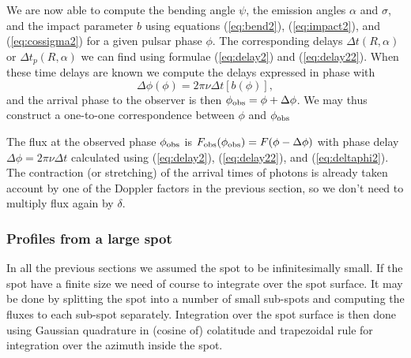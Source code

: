 \documentclass{wihuri}
\def\be{\begin{equation}}
\def\ee{\end{equation}}
\def\phiobs{\phi_{\rm obs}}
\begin{document}
We are now able to compute the bending angle $\psi$, the emission angles $\alpha$ and $\sigma$, and the impact parameter $b$ using equations (\ref{eq:bend2}), (\ref{eq:impact2}), and (\ref{eq:cossigma2}) for a given pulsar phase $\phi$. The corresponding delays $\Delta t(R,\alpha)$ or $\Delta t_{p}(R,\alpha)$ we can find using formulae (\ref{eq:delay2}) and (\ref{eq:delay22}). When these time delays are known we compute the delays expressed in phase with 
\be \label{eq:deltaphi2}
\Delta \phi(\phi) =2\pi\nu \Delta t[b(\phi)],
\ee
and the arrival phase to the observer is then $\phiobs=\phi+ \Delta\phi$. We may thus construct a one-to-one correspondence between $\phi$ and $\phiobs$

The flux at the observed phase $\phiobs$ is
${F}_{\rm obs}(\phiobs)=F(\phi-\Delta\phi)$ with
phase delay  $\Delta \phi=2\pi\nu\Delta t$
calculated using (\ref{eq:delay2}), (\ref{eq:delay22}), and (\ref{eq:deltaphi2}).
The contraction (or stretching) of the arrival times of photons is already taken account by one of the Doppler factors in the previous section, so we don't need to multiply flux again by $\delta$. 




\subsubsection{Profiles from a large spot} 

In all the previous sections we assumed the spot to be infinitesimally small. If the spot have a finite size we need of course to integrate over the spot surface. It may be done by splitting the spot into a number of small sub-spots and computing the fluxes to each sub-spot separately. Integration over the spot surface is then done using Gaussian quadrature in (cosine of) colatitude and trapezoidal rule for integration over the azimuth inside the spot. 
\end{document}
